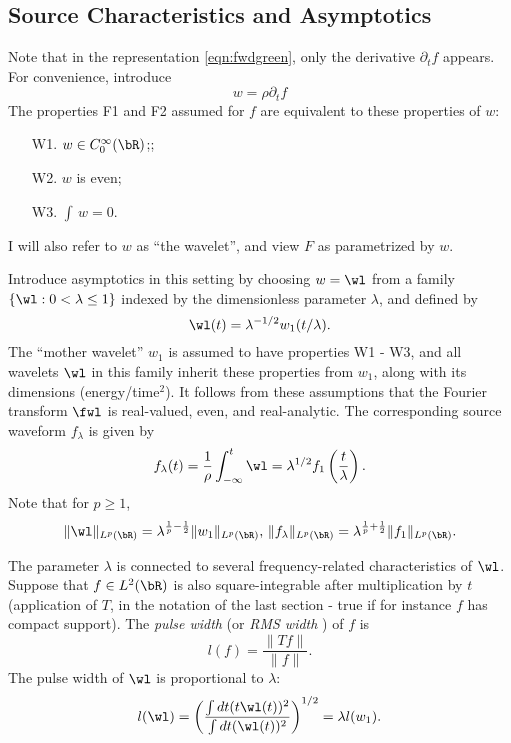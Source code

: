 \subsection{Source Characteristics and Asymptotics}

Note that in the representation \ref{eqn:fwdgreen}, only the
derivative $\partial_tf$ appears. For convenience, introduce
\begin{equation}
  \label{eqn:wavelet}
  w = \rho \partial_t f
\end{equation}
The properties F1 and F2 assumed for $f$ are equivalent to these
properties of $w$:
\begin{itemize}
\item[W1. ] $w \in C^{\infty}_0(\bR)$;;
\item[W2. ] $w$ is even;
\item[W3. ] $\int \, w = 0$.
\end{itemize}
I will also
refer to $w$ as ``the wavelet'', and view $F$ as parametrized by $w$.

Introduce asymptotics in this setting by choosing $w = \wl$
from a family $\{\wl:0 <\lambda \le 1\}$ indexed by the dimensionless parameter
$\lambda$, and defined by
\begin{equation}
  \label{eqn:wfam}
  \wl(t) = \lambda^{-1/2}w_1(t/\lambda).
\end{equation}
The  ``mother wavelet'' $w_1$ is assumed to have properties W1 - W3, and
all wavelets $\wl$ in this family
inherit these properties from $w_1$, along with its dimensions
(energy/time$^2$). It follows from these assumptions that the Fourier transform $\fwl$ is
real-valued, even, and real-analytic. The corresponding source waveform $f_{\lambda}$ is
given by
\begin{equation}
  \label{eqn:flambda}
  f_{\lambda}(t) =\frac{1}{\rho} \int_{-\infty}^t\wl =
  \lambda^{1/2}f_1\left(\frac{t}{\lambda}\right).
\end{equation}
Note that for $p \ge 1$,
\begin{equation}
  \label{eqn:lambdanorms}
  \|\wl\|_{L^p(\bR)} = \lambda ^{\frac{1}{p}-\frac{1}{2}}\|w_1\|_{L^p(\bR)},\,\|f_{\lambda}\|_{L^p(\bR)}
  = \lambda ^{\frac{1}{p}+\frac{1}{2}} \|f_1\|_{L^p(\bR)}.
\end{equation}


The parameter $\lambda$ is connected to several frequency-related
characteristics of $\wl$. Suppose that $f \in L^2(\bR)$ is also square-integrable after
multiplication by $t$ (application of $T$, in the notation of the last
section - true if for instance $f$ has compact
support). The {\em pulse width} (or {\em RMS width} ) of $f$ is
\begin{equation}
  \label{eqn:pw}
  l(f) = \frac{\|Tf\|}{\|f\|}.
\end{equation}
The pulse width of $\wl$ is proportional to $\lambda$:
\begin{equation}
  \label{eqn:wpw}
  l(\wl) = \left(\frac{\int dt (t \wl(t))^2}{\int dt (\wl(t))^2}
  \right)^{1/2} = \lambda l(w_1).
\end{equation}

